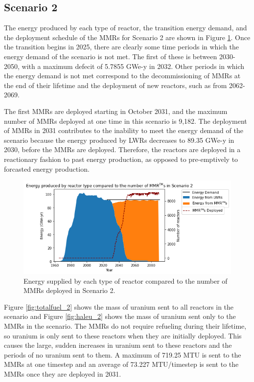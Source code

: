 \subsection{Scenario 2}
The energy produced by each type of reactor, the transition energy demand, 
and the deployment schedule of the \glspl{MMR} for Scenario 2 are shown in 
Figure \ref{fig:energy_rx_2}. Once the transition begins in 2025, there are 
clearly some time periods in which the energy demand of the scenario is 
not met. The first of these is between 2030-2050, with a maximum defecit 
of 5.7855 GWe-y in 2032. Other periods in which the energy demand is not met 
correspond to the decommissioning of \glspl{MMR} at the end of their lifetime 
and the deployment of new reactors, such as from 2062-2069. 

The first \glspl{MMR} are deployed starting in October 2031, and the 
maximum number of \glspl{MMR} deployed at one time in this scenario is 
9,182. The deployment of \glspl{MMR} in 2031 contributes to the inability to 
meet the energy demand of the scenario because the energy produced by 
\glspl{LWR} decreases to 89.35 GWe-y in 2030, before the \glspl{MMR} are 
deployed. Therefore, the reactors are deployed in a reactionary fashion to 
past energy production, as opposed to pre-emptively to forcasted energy 
production. 

\begin{figure}
    \centering 
    \includegraphics[scale=0.5]{figures/energy_scenario2.png}
    \caption{Energy supplied by each type of reactor compared to the number of 
    \glspl{MMR} deployed in Scenario 2.}
    \label{fig:energy_rx_2}
\end{figure}

Figure \ref{fig:totalfuel_2} shows the mass of uranium sent to all 
reactors in the scenario and Figure \ref{fig:haleu_2} shows the mass 
of uranium sent only to the \glspl{MMR} in the scenario. The \glspl{MMR} 
do not require refueling during their lifetime, so uranium is only 
sent to these reactors when they are initially deployed. This causes the 
large, sudden increases in uranium sent to these reactors and the periods of 
no uranium sent to them. A maximum of 719.25 MTU is sent to the \glspl{MMR} 
at one timestep and an average of 73.227 MTU/timestep is sent to the \glspl{MMR} 
once they are deployed in 2031.   

